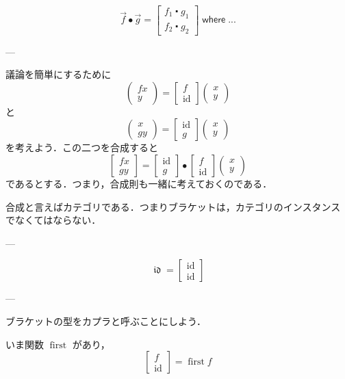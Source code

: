 \documentclass[a5paper,twoside,fleqn,draft]{jsbook}
\newcommand{\mKeyword}[1]{\mathsf{#1}}
\newcommand{\mWhereKeyword}{\mKeyword{where}}
\DeclareMathOperator{\mWhere}{\mWhereKeyword}
\newcommand{\mSpecialFunc}[1]{\mathrm{#1}}
\newcommand{\mVarSpecialFunc}[1]{\mathfrak{#1}}
\DeclareMathOperator{\mFirst}{\mSpecialFunc{first}}
\DeclareMathOperator{\mId}{\mSpecialFunc{id}}
\DeclareMathOperator{\mIdCat}{\mVarSpecialFunc{id}}
\DeclareMathOperator{\mCompFunc}{\centerdot}
\DeclareMathOperator{\mCompCat}{\bullet}
\newcommand{\mPairWith}[2]{\begin{pmatrix}#1\\#2\end{pmatrix}}
\newcommand{\mArrow}[1]{\Vec{#1}}
\begin{document}
\begin{equation}
  \mArrow{f}\mCompCat\mArrow{g}
  =
  \begin{bmatrix}
    f_1\mCompFunc g_1\\
    f_2\mCompFunc g_2
  \end{bmatrix}
  \mWhere...
\end{equation}

---

議論を簡単にするために
\begin{equation}
  \mPairWith{fx}{y}
  =\begin{bmatrix}
  f\\
  \mId
  \end{bmatrix}
  \mPairWith{x}{y}
\end{equation}
と
\begin{equation}
  \mPairWith{x}{gy}
  =\begin{bmatrix}
  \mId\\
  g
  \end{bmatrix}
  \mPairWith{x}{y}
\end{equation}
を考えよう．この二つを合成すると
\begin{equation}
  \begin{bmatrix}
    fx\\
    gy
  \end{bmatrix}
  =
  \begin{bmatrix}
    \mId\\
    g
  \end{bmatrix}
  \mCompCat
  \begin{bmatrix}
    f\\
    \mId
  \end{bmatrix}
  \mPairWith{x}{y}
\end{equation}
であるとする．つまり，合成則も一緒に考えておくのである．

合成と言えばカテゴリである．つまりブラケットは，カテゴリのインスタンス
でなくてはならない．

---

\begin{equation}
  \mIdCat
  =
  \begin{bmatrix}
    \mId\\
    \mId
  \end{bmatrix}
\end{equation}

---

ブラケットの型をカプラと呼ぶことにしよう．

いま関数 $\mFirst$ があり，
\begin{equation}
  \begin{bmatrix}
    f\\
    \mId
  \end{bmatrix}
  =\mFirst f
\end{equation}
\end{document}
